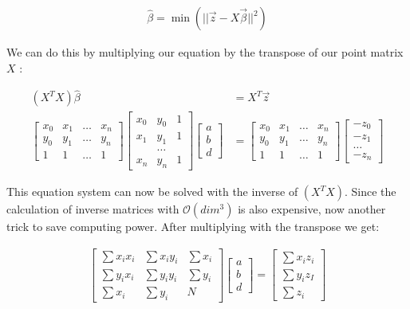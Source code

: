 \documentclass[11pt,oneside,openright]{mpreport}
\begin{document}
\begin{align*}
\hat{\beta} = \min{(|| \vec{z} - X\vec{\beta} ||^2)}
\end{align*}

We can do this by multiplying our equation by the transpose of our point matrix $X$ \cite{Goldberger1964}:

\begin{align*}
(X^TX) \hat{\beta} &= X^T \vec{z}\\
\begin{bmatrix}
x_0 & x_1 & \dots & x_n \\
y_0 & y_1 & \dots & y_n \\
1 & 1 & \dots & 1  
\end{bmatrix} 
\begin{bmatrix}
x_0 & y_0 & 1 \\
x_1 & y_1 & 1 \\
 & \dots & \\
x_n & y_n & 1 
\end{bmatrix} 
\begin{bmatrix}
a \\
b \\
d 
\end{bmatrix} 
 &= 
\begin{bmatrix}
x_0 & x_1 & \dots & x_n \\
y_0 & y_1 & \dots & y_n \\
1 & 1 & \dots & 1  
\end{bmatrix} 
\begin{bmatrix}
-z_0 \\
-z_1 \\
\dots \\
-z_n 
\end{bmatrix} 
\end{align*}
% 

This equation system can now be solved with the inverse of $(X^TX)$. Since the calculation of inverse matrices with $\mathcal{O}(dim^3)$ is also expensive, now another trick to save computing power.
After multiplying with the transpose we get:

\begin{align*}
\begin{bmatrix}
\sum x_i x_i & \sum x_i y_i & \sum x_i \\
\sum y_i x_i & \sum y_i y_i & \sum y_i \\
\sum x_i & \sum y_i & N
\end{bmatrix} 
\begin{bmatrix}
a \\
b \\
d 
\end{bmatrix} 
 = 
\begin{bmatrix}
\sum x_i z_i \\
\sum y_i z_I \\
\sum z_i 
\end{bmatrix} 
\end{align*}
\end{document}
